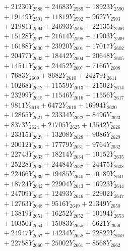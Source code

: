 \documentclass[a4paper,10pt]{article}
\begin{document}
{\begin{align}
&\;  + 21230 Y_{2588} + 24683 Y_{2589} + 18923 Y_{2590} \\[0.3ex]
&\;  + 19149 Y_{2591} + 11819 Y_{2592} + 9627 Y_{2593} \\[0.3ex]
&\;  + 21981 Y_{2594} + 24693 Y_{2595} + 22135 Y_{2596} \\[0.3ex]
&\;  + 15128 Y_{2597} + 21614 Y_{2598} + 11903 Y_{2599} \\[0.3ex]
&\;  + 16188 Y_{2600} + 23920 Y_{2601} + 17017 Y_{2602} \\[0.3ex]
&\;  + 20477 Y_{2603} + 18442 Y_{2604} + 20648 Y_{2605} \\[0.3ex]
&\;  + 14511 Y_{2606} + 24452 Y_{2607} + 7166 Y_{2608} \\[0.5ex]\allowbreak
&\;  + 7683 Y_{2609} + 8682 Y_{2610} + 24279 Y_{2611} \\[0.3ex]
&\;  + 10268 Y_{2612} + 11559 Y_{2613} + 21502 Y_{2614} \\[0.3ex]
&\;  + 23299 Y_{2615} + 11546 Y_{2616} + 11556 Y_{2617} \\[0.3ex]
&\;  + 9811 Y_{2618} + 6472 Y_{2619} + 16994 Y_{2620} \\[0.3ex]
&\;  + 12865 Y_{2621} + 23334 Y_{2622} + 8496 Y_{2623} \\[0.3ex]
&\;  + 8373 Y_{2624} + 21705 Y_{2625} + 13542 Y_{2626} \\[0.3ex]
&\;  + 23315 Y_{2627} + 13208 Y_{2628} + 9086 Y_{2629} \\[0.3ex]
&\;  + 20012 Y_{2630} + 17779 Y_{2631} + 9764 Y_{2632} \\[0.3ex]
&\;  + 22743 Y_{2633} + 18214 Y_{2634} + 10152 Y_{2635} \\[0.3ex]
&\;  + 25228 Y_{2636} + 24484 Y_{2637} + 24475 Y_{2638} \\[0.5ex]\allowbreak
&\;  + 22466 Y_{2639} + 19485 Y_{2640} + 10189 Y_{2641} \\[0.3ex]
&\;  + 18724 Y_{2642} + 22904 Y_{2643} + 16923 Y_{2644} \\[0.3ex]
&\;  + 24709 Y_{2645} + 12493 Y_{2646} + 22902 Y_{2647} \\[0.3ex]
&\;  + 12763 Y_{2648} + 9516 Y_{2649} + 21349 Y_{2650} \\[0.3ex]
&\;  + 13819 Y_{2651} + 16252 Y_{2652} + 10194 Y_{2653} \\[0.3ex]
&\;  + 10350 Y_{2654} + 15083 Y_{2655} + 6621 Y_{2656} \\[0.3ex]
&\;  + 24947 Y_{2657} + 14234 Y_{2658} + 22822 Y_{2659} \\[0.3ex]
&\;  + 22758 Y_{2660} + 25002 Y_{2661} + 8568 Y_{2662} \\[0.3ex]

\end{align}}
\end{document}
